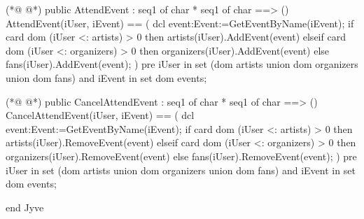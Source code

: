 \begin{vdmpp}[breaklines=true]
(*@
\label{AttendEvent:168}
@*)
 public AttendEvent : seq1 of char * seq1 of char ==> ()
 AttendEvent(iUser, iEvent) == (
  dcl event:Event:=GetEventByName(iEvent);
  if card dom ({iUser} <: artists) > 0 then
   artists(iUser).AddEvent(event)
  elseif card dom ({iUser} <: organizers) > 0  then
   organizers(iUser).AddEvent(event)
  else
   fans(iUser).AddEvent(event);
 )
  pre 
   iUser in set (dom artists union dom organizers union dom fans) and
   iEvent in set dom events;
   
(*@
\label{CancelAttendEvent:182}
@*)
 public CancelAttendEvent : seq1 of char * seq1 of char ==> ()
 CancelAttendEvent(iUser, iEvent) == (
  dcl event:Event:=GetEventByName(iEvent);
  if card dom ({iUser} <: artists) > 0 then
   artists(iUser).RemoveEvent(event)
  elseif card dom ({iUser} <: organizers) > 0 then
   organizers(iUser).RemoveEvent(event)
  else
   fans(iUser).RemoveEvent(event);
 )
  pre 
   iUser in set (dom artists union dom organizers union dom fans) and
   iEvent in set dom events;
   
  
end Jyve
\end{vdmpp}

